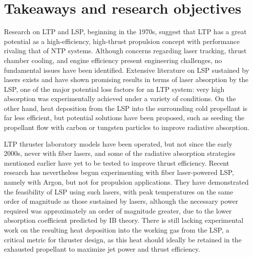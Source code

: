     \section{Takeaways and research objectives}
        Research on LTP and LSP, beginning in the 1970s, suggest that LTP has a great potential as a high-efficiency, high-thrust propulsion concept with performance rivaling that of NTP systems. Although concerns regarding laser tracking, thrust chamber cooling, and engine efficiency present engineering challenges, no fundamental issues have been identified. Extensive literature on LSP sustained by  lasers exists and have shown promising results in terms of laser absorption by the LSP, one of the major potential loss factors for an LTP system: very high absorption was experimentally achieved under a variety of conditions. On the other hand, heat deposition from the LSP into the surrounding cold propellant is far less efficient, but potential solutions have been proposed, such as seeding the propellant flow with carbon or tungsten particles to improve radiative absorption.

        LTP thruster laboratory models have been operated, but not since the early 2000s, never with fiber lasers, and some of the radiative absorption strategies mentioned earlier have yet to be tested to improve thrust efficiency. Recent research has nevertheless begun experimenting with fiber laser-powered LSP, namely with Argon, but not for propulsion applications. They have demonstrated the feasibility of LSP using such lasers, with peak temperatures on the same order of magnitude as those sustained by  lasers, although the necessary power required was approximately an order of magnitude greater, due to the lower absorption coefficient predicted by IB theory. There is still lacking experimental work on the resulting heat deposition into the working gas from the LSP, a critical metric for thruster design, as this heat should ideally be retained in the exhausted propellant to maximize jet power and thrust efficiency.

